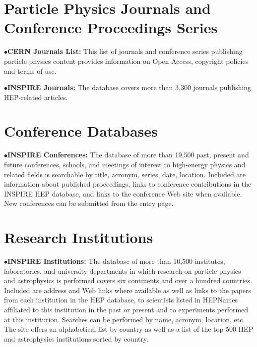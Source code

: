 \section{Particle Physics Journals and Conference Proceedings Series}%

\item{$\bullet$}{\bf CERN Journals List:} 
This list of journals and conference series publishing particle physics content provides information on Open Access, copyright policies and terms of use.

   \item{} 

\medskip

\item{$\bullet$}{\bf INSPIRE Journals:} 
The database covers more than 3,300 journals publishing HEP-related articles.

   \item{}

\medskip


\section{Conference Databases}%

\item{$\bullet$}{\bf INSPIRE Conferences:} 
The database of more than 19,500 past, present and future conferences, schools, and meetings of interest to high-energy physics and related fields is searchable by title, acronym, series, date, location. Included are information about published proceedings, links to conference contributions in the INSPIRE HEP database, and links to the conference Web site when available. New conferences can be submitted from the entry page.
	\item{}

\medskip


\section{Research Institutions}%

\item{$\bullet$}{\bf INSPIRE Institutions:} 
The database of more than 10,500 institutes, laboratories, and university departments in which research on particle physics and astrophysics is performed covers six continents and over a hundred countries. Included are address and Web links where available as well as links to the papers from each institution in the HEP database, to scientists listed in HEPNames affiliated to this institution in the past or present and to experiments performed at this institution. Searches can be performed by name, acronym, location, etc. The site offers an alphabetical list by country as well as a list of the top 500 HEP and astrophysics institutions sorted by country.

